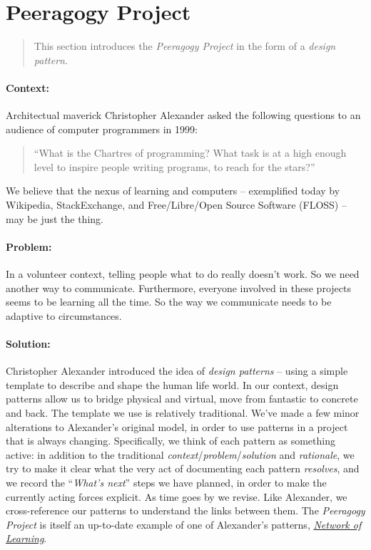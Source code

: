 \section{Peeragogy Project}

\begin{quote}
This section introduces the \emph{Peeragogy Project} in the form of a \emph{design pattern}.
\end{quote}

\paragraph{Context:}  Architectual maverick Christopher Alexander asked the following questions to an audience of computer programmers in 1999: 
\begin{quote}
``What is the Chartres of programming? What task is at a high enough level to inspire people writing programs, to reach for the stars?''
\end{quote}
We believe that the nexus of learning and computers -- exemplified today by Wikipedia, StackExchange, and Free/Libre/Open Source Software (FLOSS) -- may be just the thing.

\paragraph{Problem:} In a volunteer context, telling people what to do really doesn't work.  So we need another way to communicate.  Furthermore, everyone involved in these projects seems to be learning all the time.  So the way we communicate needs to be adaptive to circumstances.

\paragraph{Solution:} Christopher Alexander introduced the idea of \emph{design patterns} -- using a simple template to describe and shape the human life world.  In our context, design patterns allow us to bridge physical and virtual, move from fantastic to concrete and back.  The template we use is relatively traditional.  We've made a few minor alterations to Alexander's original model, in order to use patterns in a project that is always changing.  Specifically, we think of each pattern as something active: in addition to the traditional \emph{context}/\emph{problem}/\emph{solution} and \emph{rationale}, we try to make it clear what the very act of documenting each pattern \emph{resolves}, and we record the ``\emph{What's next}'' steps we have planned, in order to make the currently acting forces explicit. As time goes by we revise.  Like Alexander, we cross-reference our patterns to understand the links between them. The \emph{Peeragogy Project} is itself an up-to-date example of one of Alexander's patterns, \href{http://en.wikipedia.org/wiki/Networked_learning#1970s}{\emph{Network of Learning}}.

